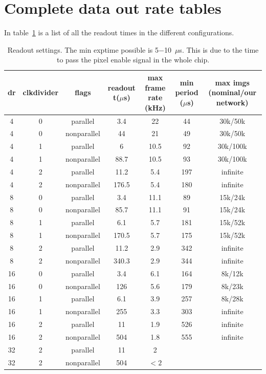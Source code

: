 \documentclass{article}
\begin{document}
\section{Complete data out rate tables}

In table~\ref{tframescomplete} is a list of all the readout times in the different configurations.
\begin{tiny}
\begin{table}
\begin{flushleft}
\begin{tabular}{|c|c|c|c|c|c|c|}
\hline
\tiny{dr} & \tiny{clkdivider} & \tiny{flags} & \tiny{readout t($\mu$s)} & \tiny{max frame rate (kHz)} & \tiny{min period ($\mu$s)} & \tiny{max imgs (nominal/our network)}\\
\hline
4 & 0 & parallel & 3.4 & 22 &  44 & 30k/50k\\
\hline
4 & 0 & nonparallel & 44 & 21 & 49 & 30k/50k\\
\hline
4 & 1 & parallel & 6 & 10.5 &  92 & 30k/100k\\
\hline
4 & 1 & nonparallel & 88.7 & 10.5 & 93 & 30k/100k\\
\hline
4 & 2 & parallel & 11.2 & 5.4 & 197 & infinite\\
\hline
4 & 2 & nonparallel & 176.5 & 5.4 & 180 & infinite\\
\hline
\hline
8 & 0 & parallel & 3.4 & 11.1 & 89 & 15k/24k\\
\hline
8 & 0 & nonparallel & 85.7 & 11.1 & 91 & 15k/24k\\
\hline
8 & 1 & parallel & 6.1 & 5.7 & 181 & 15k/52k\\
\hline
8 & 1 & nonparallel & 170.5 & 5.7 & 175 & 15k/52k\\
\hline
8 & 2 & parallel & 11.2 &  2.9 &  342 & infinite\\
\hline
8 & 2 & nonparallel & 340.3 &  2.9 &  344 & infinite\\
\hline
\hline
16 & 0 & parallel & 3.4 & 6.1 & 164 & 8k/12k\\
\hline
16 & 0 & nonparallel &  126 & 5.6& 179 & 8k/23k\\
\hline
16 & 1 & parallel &  6.1 & 3.9&  257 & 8k/28k\\
\hline
16 & 1 & nonparallel & 255 & 3.3&  303 & infinite\\
\hline
16 & 2 & parallel &  11 & 1.9  & 526 &infinite \\
\hline
16 & 2 & nonparallel & 504 & 1.8 & 555 & infinite\\
\hline
\hline
32 & 2 & parallel &  11 & 2  & &\\
\hline
32 & 2 & nonparallel & 504 & $<2$  & &\\
\hline
\end{tabular}
\caption{Readout settings. The {\tiny{min exptime}} possible is 5$-$10~$\mu$s. This is due to the time to pass the pixel enable signal in the whole chip.}
\label{tframescomplete}
\end{flushleft}
\end{table}
\end{tiny}
\end{document}
